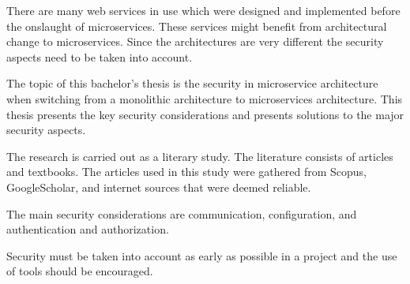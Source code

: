 \begin{enabstract}
    \begin{sloppypar}
        There are many web services in use which were designed and implemented 
        before the onslaught of microservices. These services might benefit 
        from architectural change to microservices. Since the architectures
        are very different the security aspects need to be taken into account.
    \end{sloppypar}
    \begin{sloppypar}    
        The topic of this bachelor's thesis is the security in microservice 
        architecture when switching from a monolithic architecture to 
        microservices architecture. This thesis presents the key security 
        considerations and presents solutions to the major security aspects.
    \end{sloppypar}
    \begin{sloppypar}
        The research is carried out as a literary study.
        The literature consists of articles and textbooks.
        The articles used in this study were gathered from Scopus, 
        GoogleScholar, and internet sources that were deemed reliable.
    \end{sloppypar}
    \begin{sloppypar}
        The main security considerations are communication, configuration, 
        and authentication and authorization. 
    \end{sloppypar}
    \begin{sloppypar}
        Security must be taken into account as early as possible in a project 
        and the use of tools should be encouraged.
    \end{sloppypar}
\end{enabstract}
